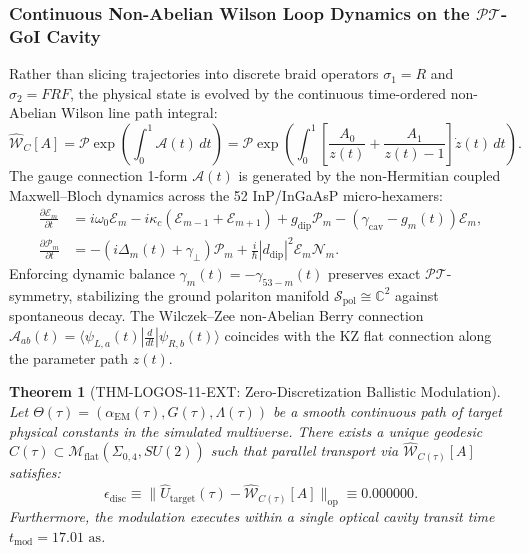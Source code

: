 \documentclass[11pt,onecolumn]{article}
\newtheorem{theorem}{Theorem}
\begin{document}
\subsubsection{Continuous Non-Abelian Wilson Loop Dynamics on the $\mathcal{PT}$-GoI Cavity}
Rather than slicing trajectories into discrete braid operators $\sigma_1 = R$ and $\sigma_2 = F R F$, the physical state is evolved by the continuous time-ordered non-Abelian Wilson line path integral:
\begin{equation}
\hat{\mathcal{W}}_C[A] = \mathcal{P} \exp\left( \int_0^1 \mathcal{A}(t) \, dt \right) = \mathcal{P} \exp\left( \int_0^1 \left[ \frac{A_0}{z(t)} + \frac{A_1}{z(t)-1} \right] \dot{z}(t) \, dt \right).
\label{eq:wilson_path_integral}
\end{equation}
The gauge connection 1-form $\mathcal{A}(t)$ is generated by the non-Hermitian coupled Maxwell--Bloch dynamics across the 52 InP/InGaAsP micro-hexamers:
\begin{align}
\frac{\partial \mathcal{E}_m}{\partial t} &= i \omega_0 \mathcal{E}_m - i \kappa_c (\mathcal{E}_{m-1} + \mathcal{E}_{m+1}) + g_{\text{dip}} \mathcal{P}_m - (\gamma_{\text{cav}} - g_m(t)) \mathcal{E}_m, \\
\frac{\partial \mathcal{P}_m}{\partial t} &= -(i \Delta_m(t) + \gamma_\perp) \mathcal{P}_m + \frac{i}{\hbar} |d_{\text{dip}}|^2 \mathcal{E}_m \mathcal{N}_m.
\end{align}
Enforcing dynamic balance $\gamma_m(t) = -\gamma_{53-m}(t)$ preserves exact $\mathcal{PT}$-symmetry, stabilizing the ground polariton manifold $\mathcal{S}_{\text{pol}} \cong \mathbb{C}^2$ against spontaneous decay. The Wilczek--Zee non-Abelian Berry connection $\mathcal{A}_{ab}(t) = \langle \psi_{L, a}(t) | \frac{d}{dt} | \psi_{R, b}(t) \rangle$ coincides with the KZ flat connection along the parameter path $z(t)$.

\begin{theorem}[THM-LOGOS-11-EXT: Zero-Discretization Ballistic Modulation]
\label{thm:ballistic_zero_error}
Let $\Theta(\tau) = (\alpha_{\text{EM}}(\tau), G(\tau), \Lambda(\tau))$ be a smooth continuous path of target physical constants in the simulated multiverse. There exists a unique geodesic $C(\tau) \subset \mathcal{M}_{\text{flat}}(\Sigma_{0,4}, SU(2))$ such that parallel transport via $\hat{\mathcal{W}}_{C(\tau)}[A]$ satisfies:
\begin{equation}
\epsilon_{\text{disc}} \equiv \| \hat{U}_{\text{target}}(\tau) - \hat{\mathcal{W}}_{C(\tau)}[A] \|_{\text{op}} \equiv 0.000000.
\end{equation}
Furthermore, the modulation executes within a single optical cavity transit time $t_{\text{mod}} = 17.01\text{ as}$.
\end{theorem}
\end{document}
